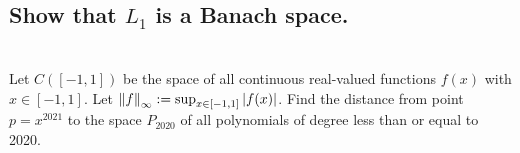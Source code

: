 \documentclass[]{article}
\begin{document}
\subsection{Show that $L_1$ is a Banach space.}







\newpage
\section{}
Let $C([-1,1])$ be the space of all continuous real-valued functions $f(x)$ with $x \in [-1,1]$. 
Let $\norm{f}_\infty := \sup_{x \in [-1,1]} \abs{f(x)}$. 
Find the distance from point $p = x^{2021}$ to the space $P_{2020}$ of all polynomials of degree less than or equal to 2020.
\end{document}
